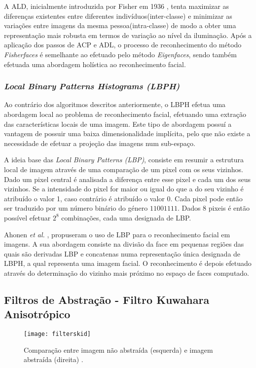A ALD, inicialmente introduzida por Fisher em 1936 \cite{FISHER1936}, tenta maximizar as diferenças existentes entre diferentes indivíduos(inter-classe) e minimizar as variações entre imagens da mesma pessoa(intra-classe) de modo a obter uma representação mais robusta em termos de variação ao nível da iluminação. Após a aplicação dos passos de ACP e ADL, o processo de reconhecimento do método \textit{Fisherfaces} é semelhante ao efetuado pelo método \textit{Eigenfaces}, sendo também efetuada uma abordagem holística ao reconhecimento facial.


\subsubsection*	{\textit{Local Binary Patterns Histograms (LBPH)}}
Ao contrário dos algoritmos descritos anteriormente, o LBPH efetua uma abordagem local ao problema de reconhecimento facial, efetuando uma extração das características locais de uma imagem. Este tipo de abordagem possuí a vantagem de possuir uma baixa dimensionalidade implícita, pelo que não existe a necessidade de efetuar a projeção das imagens num sub-espaço.

A ideia base das \textit{Local Binary Patterns (LBP)}, consiste em resumir a estrutura local de imagem através de uma comparação de um pixel com os seus vizinhos. Dado um pixel central é analisada a diferença entre esse pixel e cada um dos seus vizinhos. Se a intensidade do pixel for maior ou igual do que a do seu vizinho é atribuído o valor 1, caso contrário é atribuído o valor 0. Cada pixel pode então ser traduzido por um número binário do género $11001111$. Dados $8$ pixeis é então possível efetuar $2^8$ combinações, cada uma designada de LBP.

Ahonen \textit{et al.} \cite{ahonen2004face}, propuseram o uso de LBP para o reconhecimento facial em imagens. A sua abordagem consiste na divisão da face em pequenas regiões das quais são derivadas LBP e concatenas numa representação única designada de LBPH, a qual representa uma imagem facial. O reconhecimento é depois efetuado através do determinação do vizinho mais próximo no espaço de faces computado.

\subsection{Filtros de Abstração - Filtro Kuwahara Anisotrópico}
\begin{figure}[ht]
  \begin{center}
    \leavevmode
    \texttt{[image: filterskid]}
    \caption{Comparação entre imagem não abstraída (esquerda) e imagem abstraída (direita) \cite{Kyprianidis2009}.}	
    \label{fig:filterskid}
  \end{center}
\end{figure}

